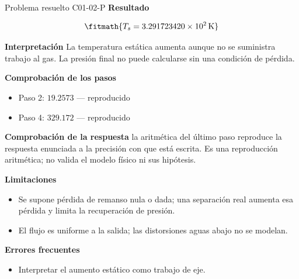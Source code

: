 \documentclass[10pt,openany]{book}
\begin{document}
\begin{studiumworked}{Problema resuelto C01-02-P}
\noindent\textbf{Resultado}

\[
\fitmath{T_s=3.291723420\times10^{2}\,\mathrm{K}}
\]

\noindent\textbf{Interpretación}
La temperatura estática aumenta aunque no se suministra trabajo al gas. La presión final no puede calcularse sin una condición de pérdida.

\noindent\textbf{Comprobación de los pasos}
\begin{itemize}
\item Paso 2: $19.2573$ — reproducido
\item Paso 4: $329.172$ — reproducido
\end{itemize}

\noindent\textbf{Comprobación de la respuesta} la aritmética del último paso reproduce la respuesta enunciada a la precisión con que está escrita. Es una reproducción aritmética; no valida el modelo físico ni sus hipótesis.

\noindent\textbf{Limitaciones}
\begin{itemize}
\item Se supone pérdida de remanso nula o dada; una separación real aumenta esa pérdida y limita la recuperación de presión.
\item El flujo es uniforme a la salida; las distorsiones aguas abajo no se modelan.
\end{itemize}

\noindent\textbf{Errores frecuentes}
\begin{itemize}
\item Interpretar el aumento estático como trabajo de eje.
\end{itemize}
\end{studiumworked}
\end{document}
